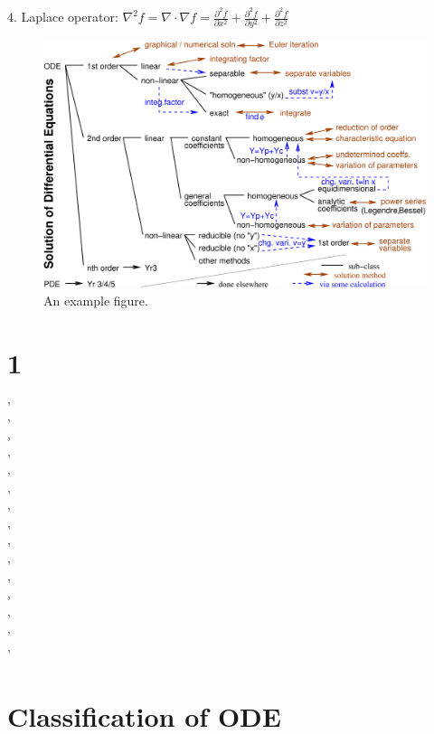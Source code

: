 \documentclass[twocolumn]{article}
\newcommand{\sectionspace}{\vspace*{1em}}
\begin{document}
4. Laplace operator: $\nabla^2 f = \nabla  \cdot \nabla  f = \frac{\partial^2 f}{\partial x^2} + \frac{\partial^2 f}{\partial y^2} + \frac{\partial^2 f}{\partial z^2}$


\sectionspace


\begin{figure} %
	\centering
	\includegraphics[width=\linewidth]{ODE_solution.pdf} %
	\caption{An example figure.}
	\label{fig:example}
\end{figure}

\section{1}
'\\'\\'\\'\\'\\'\\'\\'\\'\\'\\'\\'\\'\\'\\'\\

\section{Classification of ODE}


\sectionspace
\end{document}
